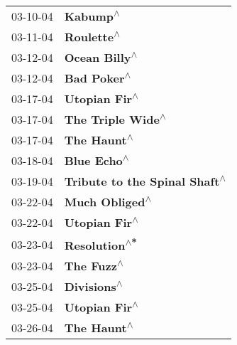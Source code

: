 \begin{supertabular}{p{0.25\columnwidth}p{0.75\columnwidth}}
 03-10-04 &                                                                   \textbf{Kabump\textsuperscript{$\wedge$}} \\
 03-11-04 &                                                                 \textbf{Roulette\textsuperscript{$\wedge$}} \\
 03-12-04 &                                                              \textbf{Ocean Billy\textsuperscript{$\wedge$}} \\
 03-12-04 &                                                                \textbf{Bad Poker\textsuperscript{$\wedge$}} \\
 03-17-04 &                                                              \textbf{Utopian Fir\textsuperscript{$\wedge$}} \\
 03-17-04 &                                                          \textbf{The Triple Wide\textsuperscript{$\wedge$}} \\
 03-17-04 &                                                                \textbf{The Haunt\textsuperscript{$\wedge$}} \\
 03-18-04 &                                                                \textbf{Blue Echo\textsuperscript{$\wedge$}} \\
 03-19-04 &                                              \textbf{Tribute to the Spinal Shaft\textsuperscript{$\wedge$}} \\
 03-22-04 &                                                             \textbf{Much Obliged\textsuperscript{$\wedge$}} \\
 03-22-04 &                                                              \textbf{Utopian Fir\textsuperscript{$\wedge$}} \\
 03-23-04 &                                                              \textbf{Resolution\textsuperscript{$\wedge$*}} \\
 03-23-04 &                                                                 \textbf{The Fuzz\textsuperscript{$\wedge$}} \\
 03-25-04 &                                                                \textbf{Divisions\textsuperscript{$\wedge$}} \\
 03-25-04 &                                                              \textbf{Utopian Fir\textsuperscript{$\wedge$}} \\
 03-26-04 &                                                                \textbf{The Haunt\textsuperscript{$\wedge$}} \\

\end{supertabular}
